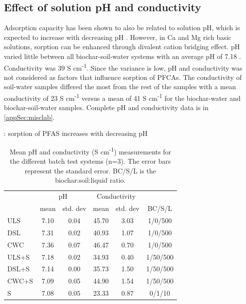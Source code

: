 \subsection{Effect of solution pH and conductivity}
Adsorption capacity has been shown to also be related to solution pH, which is expected to increase with decreasing pH \citep{du2014adsorption}. However, in Ca and Mg rich basic solutions, sorption can be enhanced through divalent cation bridging effect. pH varied little between all biochar-soil-water systems with an average pH of 7.18 . Conductivity was 39  \textmu S cm\textsuperscript{-1}. Since the variance is low, pH and conductivity was not considered as factors that influence sorption of PFCAs. The conductivity of soil-water samples differed the most from the rest of the samples with a mean conductivity of 23  \textmu S cm\textsuperscript{-1} versus a mean of 41  \textmu S cm\textsuperscript{-1} for the biochar-water and biochar-soil-water samples. Complete pH and conductivity data is in \cref{appSec:misclab}.

\citep{zhang2013sorption}: sorption of PFAS increases with decreasing pH

\begin{table}
\centering
\caption{Mean pH and conductivity (\textmu S cm\textsuperscript{-1}) measurements for the different batch test systems (n=3). The error bars represent the standard error. BC/S/L is the biochar:soil:liquid ratio.}
\label{tab:pHcond}
\begin{tabular}{lccccc}
\toprule
 & \multicolumn{2}{c}{pH} & \multicolumn{2}{c}{Conductivity} & \\ \cline{2-5}
 & mean & std. dev & mean & std. dev & BC/S/L\\ 
\midrule
ULS & 7.10 & 0.04 & 45.70 & 3.03 & 1/0/500\\
DSL & 7.31 & 0.02 & 40.93 & 1.07 & 1/0/500\\
CWC & 7.36 & 0.07 & 46.47 & 0.70 & 1/0/500\\
ULS+S & 7.18 & 0.02 & 34.93 & 0.40 & 1/50/500\\
DSL+S & 7.14 & 0.00 & 35.73 & 1.50 & 1/50/500\\
CWC+S & 7.09 & 0.05 & 44.90 & 1.54 & 1/50/500\\
S & 7.08 & 0.05 & 23.33 & 0.87 & 0/1/10\\
\bottomrule
\end{tabular}
\end{table}



